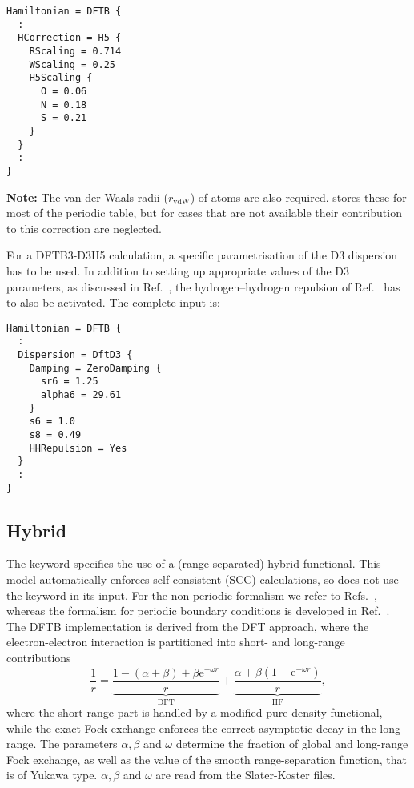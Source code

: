 \begin{verbatim}
Hamiltonian = DFTB {
  :
  HCorrection = H5 {
    RScaling = 0.714
    WScaling = 0.25
    H5Scaling {
      O = 0.06
      N = 0.18
      S = 0.21
    }
  }
  :
}
\end{verbatim}

\textbf{Note:} \label{page:dftbp.H5} The van der Waals radii ($r_\text{vdW}$) of
atoms are also required. \dftbp{} stores these for most of the periodic table,
but for cases that are not available their contribution to this correction are
neglected.

For a DFTB3-D3H5 calculation, a specific parametrisation of the D3 dispersion
has to be used. In addition to setting up appropriate values of the D3
parameters, as discussed in Ref.~\cite{rezac-jctc-13-2017}, the
hydrogen--hydrogen repulsion of Ref.~\cite{rezac-jctc-8-2012} has to also be
activated. The complete input is:
\begin{verbatim}
Hamiltonian = DFTB {
  :
  Dispersion = DftD3 {
    Damping = ZeroDamping {
      sr6 = 1.25
      alpha6 = 29.61
    }
    s6 = 1.0
    s8 = 0.49
    HHRepulsion = Yes
  }
  :
}
\end{verbatim}

\subsection{Hybrid}
\label{sec:dftbp.Hybrid}

The  keyword specifies the use of a (range-separated)
hybrid functional.  This model automatically enforces self-consistent
(SCC) calculations, so does not use the  keyword in its input.
For the non-periodic formalism we refer to
Refs.~\cite{niehaus-PSSB-249-237,lutsker-JCP-143-184107}, whereas the formalism for
periodic boundary conditions is developed in Ref.~\cite{vdH-PRM-7-063802}.
The DFTB implementation is derived from the DFT approach, where the electron-electron
interaction is partitioned into short- and long-range contributions
\begin{equation*}
\frac{1}{r} = \underbrace{\frac{1 - (\alpha + \beta)
+ \beta \mathrm{e}^{-\omega r}}{r}}_{\text{DFT}} + \underbrace{\frac{\alpha
+ \beta (1 - \mathrm{e}^{-\omega r})}{r}}_{\text{HF}},
\end{equation*}
where the short-range part is handled by a modified pure density functional, while
the exact Fock exchange enforces the correct asymptotic decay in the long-range.
The parameters $\alpha, \beta$ and $\omega$ determine the fraction of global and
long-range Fock exchange, as well as the value of the smooth range-separation function,
that is of Yukawa type. $\alpha, \beta$ and $\omega$ are read from the Slater-Koster files.

